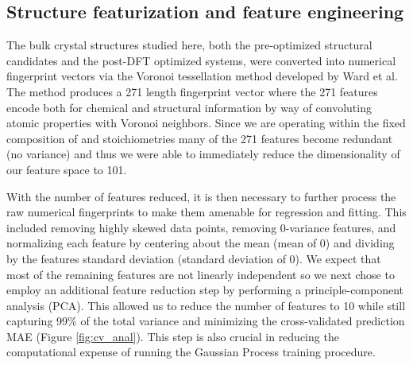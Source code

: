 

\subsection{Structure featurization and feature engineering}
%

%
The bulk crystal structures studied here,
both the pre-optimized structural candidates and the post-DFT optimized systems,
were converted into numerical fingerprint vectors via the Voronoi tessellation method developed by Ward et al.~\cite{Ward2017}
%
The method produces a \num{271} length fingerprint vector where the \num{271} features encode both for chemical and structural information by way of convoluting atomic properties with Voronoi neighbors.
%
Since we are operating within the fixed composition of \IrOtwo and \IrOthree stoichiometries many of the \num{271} features become redundant (no variance) and thus we were able to immediately reduce the dimensionality of our feature space to \num{101}.


%
With the number of features reduced, it is then necessary to further process the raw numerical fingerprints to make them amenable for regression and fitting.
%
This included removing highly skewed data points, removing 0-variance features, and normalizing each feature by centering about the mean (mean of 0) and dividing by the features standard deviation (standard deviation of 0).
%
We expect that most of the remaining features are not linearly independent so we next chose to employ an additional feature reduction step by performing a principle-component analysis (PCA).
%
This allowed us to reduce the number of features to \num{10} while still capturing 99\% of the total variance and minimizing the cross-validated prediction MAE (Figure \ref{fig:cv_anal}).
%
This step is also crucial in reducing the computational expense of running the Gaussian Process training procedure.

